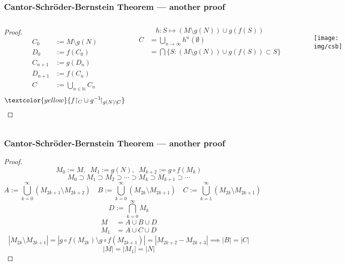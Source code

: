 \documentclass[UTF8,aspectratio=43,11pt,colorlinks,compress,openany]{beamer}%
\begin{document}
\begin{frame}\frametitle{Cantor-Schr\"oder-Bernstein Theorem --- another proof}
\setlength\abovedisplayskip{0pt}
\setlength\belowdisplayskip{0pt}
	\vspace{-2ex}
	\begin{columns}
			\begin{proof}
				\begin{align*}
				C_0&:=M\setminus g(N)\\
				D_0&:=f(C_0)\\
				C_{n+1}&:=g(D_n)\\
				D_{n+1}&:=f(C_n)\\
				C&:=\bigcup\limits_{n\in\mathbb{N}}C_n
				\end{align*}
				\[\textcolor{yellow}{f{\restriction_C}\cup g^{-1}\!{\restriction_{g(N)\setminus\!C}}}\]
			\end{proof}\vspace{-2ex}
			\[h: S\mapsto (M\setminus g(N))\cup g(f(S))\]
			\begin{align*}
			C&=\bigcup\limits_{n\to\infty}h^n(\emptyset)\\
			&=\bigcap\Big\{S: (M\setminus g(N))\cup g(f(S))\subset S\Big\}
			\end{align*}
		\begin{figure}
			\texttt{[image: img/csb]}
		\end{figure}
	\end{columns}
\end{frame}

\begin{frame}\frametitle{Cantor-Schr\"oder-Bernstein Theorem --- another proof}\vspace{-1ex}
	\begin{proof}
		\[M_0:=M,\;\;M_1:=g(N),\;\;M_{k+2}:=g\circ f(M_k)\]
		\[M_0\supset M_1\supset M_2\supset\cdots\supset M_k\supset M_{k+1}\supset\cdots\]
	\setlength\abovedisplayskip{0pt}
	\setlength\belowdisplayskip{0pt}
		\[
		A:=\bigcup\limits_{k=0}^\infty (M_{2k+1}\setminus M_{2k+2})\quad
		B:=\bigcup\limits_{k=0}^\infty (M_{2k}\setminus M_{2k+1})\quad
		C:=\bigcup\limits_{k=1}^\infty (M_{2k}\setminus M_{2k+1})\]
		\[D:=\bigcap\limits_{k=0}^\infty M_k\]
		\begin{align*}
		M&=A\cup B\cup D\\
		M_1&=A\cup C\cup D
		\end{align*}
		\[|M_{2k}\setminus M_{2k+1}|=|g\circ f(M_{2k})\setminus g\circ f(M_{2k+1})|=|M_{2k+2}-M_{2k+3}|\implies |B|=|C|\]
		\[|M|=|M_1|=|N|\]
	\end{proof}
\end{frame}
\end{document}
